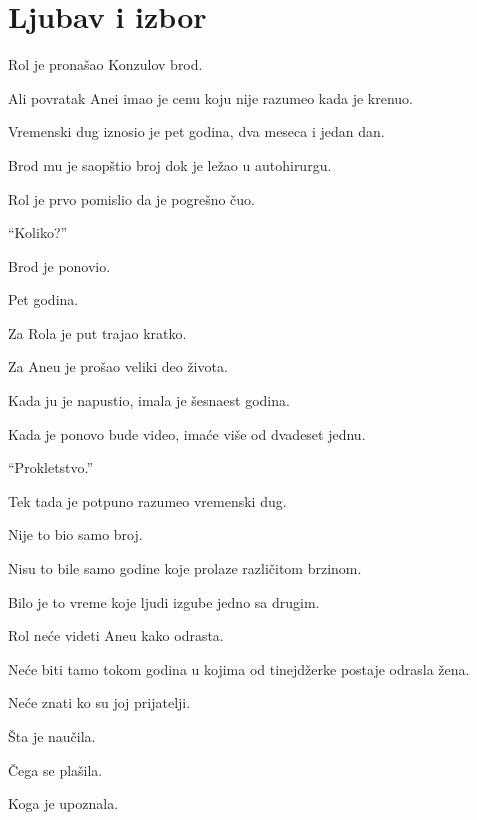 
\chapter{Ljubav i izbor}


Rol je pronašao Konzulov brod.

Ali povratak Anei imao je cenu koju nije razumeo kada je krenuo.

\bigskip

Vremenski dug iznosio je pet godina, dva meseca i jedan dan.

\bigskip

Brod mu je saopštio broj dok je ležao u autohirurgu.

Rol je prvo pomislio da je pogrešno čuo.

``Koliko?''

Brod je ponovio.

\bigskip

Pet godina.

\bigskip

Za Rola je put trajao kratko.

Za Aneu je prošao veliki deo života.

\bigskip

Kada ju je napustio, imala je šesnaest godina.

Kada je ponovo bude video, imaće više od dvadeset jednu.

\bigskip

``Prokletstvo.''

Tek tada je potpuno razumeo vremenski dug.

Nije to bio samo broj.

Nisu to bile samo godine koje prolaze različitom brzinom.

\bigskip

Bilo je to vreme koje ljudi izgube jedno sa drugim.

\bigskip

Rol neće videti Aneu kako odrasta.

Neće biti tamo tokom godina u kojima od tinejdžerke postaje odrasla žena.

Neće znati ko su joj prijatelji.

Šta je naučila.

Čega se plašila.

Koga je upoznala.

